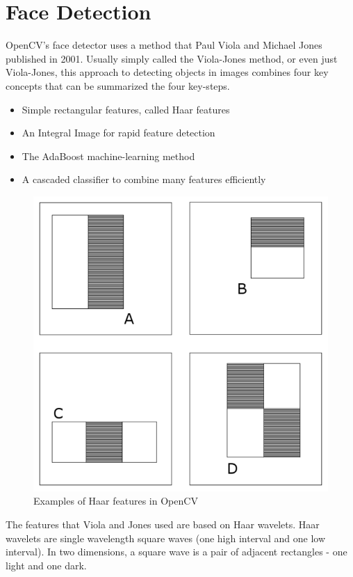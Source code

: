 \documentclass[12pt]{report}			%
\begin{document}
\section{ Face Detection }
OpenCV's face detector uses a method that Paul Viola and Michael Jones published in 2001\cite{Viola01}. Usually simply called the Viola-Jones method, or even just Viola-Jones, this approach to detecting objects in images combines four key concepts that can be summarized the four key-steps.
\begin{itemize}
	\item Simple rectangular features, called Haar features
	\item An Integral Image for rapid feature detection
	\item The AdaBoost machine-learning method
	\item A cascaded classifier to combine many features efficiently
\end{itemize}
\begin{figure}
	\centering
	\includegraphics[scale=0.3]{img/fd5.png}
	\caption{Examples of Haar features in OpenCV}
	\label{fig:fd1}
\end{figure}
The features that Viola and Jones used are based on Haar wavelets. Haar wavelets are single wavelength square waves (one high interval and one low interval). In two dimensions, a square wave is a pair of adjacent rectangles - one light and one dark.\\
\end{document}
